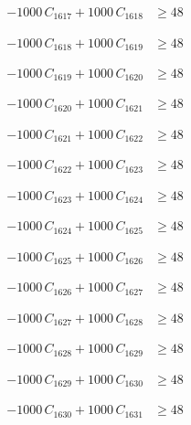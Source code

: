 \documentclass[a4paper,11pt]{article}
\begin{document}
\begin{align}
-1000\,C_{1617} + 1000\,C_{1618} &\geq 48 \nonumber
\end{align}

\begin{align}
-1000\,C_{1618} + 1000\,C_{1619} &\geq 48 \nonumber
\end{align}

\begin{align}
-1000\,C_{1619} + 1000\,C_{1620} &\geq 48 \nonumber
\end{align}

\begin{align}
-1000\,C_{1620} + 1000\,C_{1621} &\geq 48 \nonumber
\end{align}

\begin{align}
-1000\,C_{1621} + 1000\,C_{1622} &\geq 48 \nonumber
\end{align}

\begin{align}
-1000\,C_{1622} + 1000\,C_{1623} &\geq 48 \nonumber
\end{align}

\begin{align}
-1000\,C_{1623} + 1000\,C_{1624} &\geq 48 \nonumber
\end{align}

\begin{align}
-1000\,C_{1624} + 1000\,C_{1625} &\geq 48 \nonumber
\end{align}

\begin{align}
-1000\,C_{1625} + 1000\,C_{1626} &\geq 48 \nonumber
\end{align}

\begin{align}
-1000\,C_{1626} + 1000\,C_{1627} &\geq 48 \nonumber
\end{align}

\begin{align}
-1000\,C_{1627} + 1000\,C_{1628} &\geq 48 \nonumber
\end{align}

\begin{align}
-1000\,C_{1628} + 1000\,C_{1629} &\geq 48 \nonumber
\end{align}

\begin{align}
-1000\,C_{1629} + 1000\,C_{1630} &\geq 48 \nonumber
\end{align}

\begin{align}
-1000\,C_{1630} + 1000\,C_{1631} &\geq 48 \nonumber
\end{align}
\end{document}
